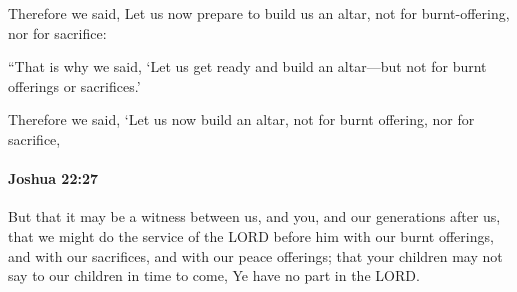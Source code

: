 			\begin{versebox}
					\item[BHS] 
					\item[ASV] Therefore we said, Let us now prepare to build us an altar, not for burnt-offering, nor for sacrifice:
					\item[NIV] “That is why we said, ‘Let us get ready and build an altar—but not for burnt offerings or sacrifices.’
					\item[NRSV] Therefore we said, ‘Let us now build an altar, not for burnt offering, nor for sacrifice,
			\end{versebox}

		\paragraph{Joshua 22:27} %
			\label{JOSHUA-22-27}

			But that it may be a witness between us, and you, and our generations after us, that we might do the service of the LORD before him with our burnt offerings, and with our sacrifices, and with our peace offerings; that your children may not say to our children in time to come, Ye have no part in the LORD.

